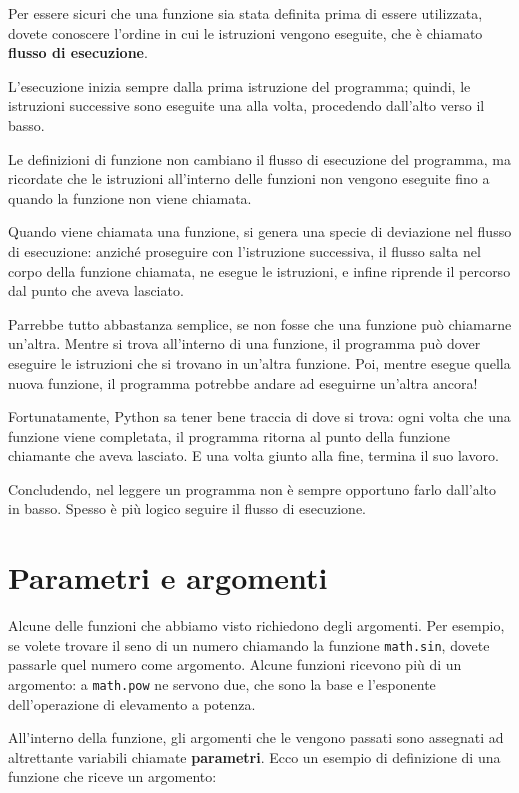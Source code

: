 \documentclass[10pt]{book}
\begin{document}
Per essere sicuri che una funzione sia stata definita prima di essere utilizzata, dovete conoscere l'ordine in cui le istruzioni vengono eseguite, che è chiamato {\bf flusso di esecuzione}.

L'esecuzione inizia sempre dalla prima istruzione del programma; quindi, le istruzioni successive sono eseguite una alla volta, procedendo dall'alto verso il basso.

Le definizioni di funzione non cambiano il flusso di esecuzione del programma, ma ricordate che le istruzioni all'interno delle funzioni non vengono eseguite fino a quando la funzione non viene chiamata. 

Quando viene chiamata una funzione, si genera una specie di deviazione nel flusso di esecuzione: anziché proseguire con l'istruzione successiva, il flusso salta nel corpo della funzione chiamata, ne esegue le istruzioni, e infine riprende il percorso dal punto che aveva lasciato.

Parrebbe tutto abbastanza semplice, se non fosse che una funzione può chiamarne un'altra. Mentre si trova all'interno di una funzione, il programma può dover eseguire le istruzioni che si trovano in un'altra funzione. Poi, mentre esegue quella nuova funzione, il programma potrebbe andare ad eseguirne un'altra ancora!

Fortunatamente, Python sa tener bene traccia di dove si trova: ogni volta che una funzione viene completata, il programma ritorna al punto della funzione chiamante che aveva lasciato. E una volta giunto alla fine, termina il suo lavoro.

Concludendo, nel leggere un programma non è sempre opportuno farlo dall'alto in basso. Spesso è più logico seguire il flusso di esecuzione.


\section{Parametri e argomenti}
\label{parametri}

Alcune delle funzioni che abbiamo visto richiedono degli argomenti. Per esempio, se volete trovare il seno di un numero chiamando la funzione {\tt math.sin}, dovete passarle quel numero come argomento. Alcune funzioni ricevono più di un argomento: a {\tt math.pow} ne servono due, che sono la base e l'esponente dell'operazione di elevamento a potenza. 

All'interno della funzione, gli argomenti che le vengono passati sono assegnati ad altrettante variabili chiamate {\bf parametri}. Ecco un esempio di definizione di una funzione che riceve un argomento:
\end{document}
